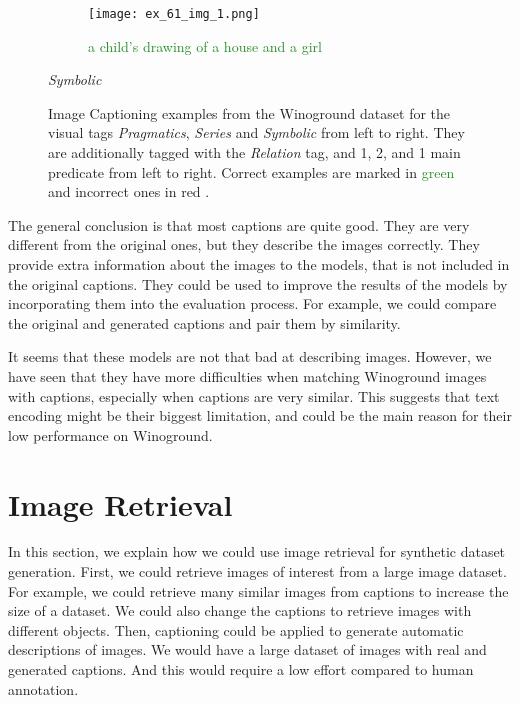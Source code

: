 \begin{figure}[ht]
\begin{minipage}{.30\textwidth}
        \begin{subfigure}{\textwidth}
        \centering
        \texttt{[image: ex\_61\_img\_1.png]}
        \caption{\textcolor{ForestGreen}{a child's drawing of a house and a girl \cmark}}
        \end{subfigure}%
        \caption*{\textit{Symbolic}}
    \end{minipage}
    \caption{Image Captioning examples from the Winoground dataset for the visual tags \textit{Pragmatics}, \textit{Series} and \textit{Symbolic} from left to right. They are additionally tagged with the \textit{Relation} tag, and 1, 2, and 1 main predicate from left to right.  Correct examples are marked in \textcolor{ForestGreen}{green \cmark} and incorrect ones in \textcolor{BrickRed}{red \xmark}.}
    \label{fig:captioning-examples-visual}
\end{figure}

The general conclusion is that most captions are quite good. They are very different from the original ones, but they describe the images correctly. They provide extra information about the images to the models, that is not included in the original captions. They could be used to improve the results of the models by incorporating them into the evaluation process. For example, we could compare the original and generated captions and pair them by similarity. 

It seems that these models are not that bad at describing images. However, we have seen that they have more difficulties when matching Winoground images with captions, especially when captions are very similar. This suggests that text encoding might be their biggest limitation, and could be the main reason for their low performance on Winoground.

\section{Image Retrieval} \label{sec:image_retrieval}

In this section, we explain how we could use image retrieval for synthetic dataset generation. First, we could retrieve images of interest from a large image dataset. For example, we could retrieve many similar images from captions to increase the size of a dataset. We could also change the captions to retrieve images with different objects. Then, captioning could be applied to generate automatic descriptions of images. We would have a large dataset of images with real and generated captions. And this would require a low effort compared to human annotation.

